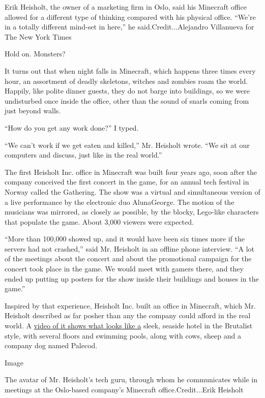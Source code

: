 Erik Heisholt, the owner of a marketing firm in Oslo, said his Minecraft
office allowed for a different type of thinking compared with his
physical office. ``We're in a totally different mind-set in here,'' he
said.Credit...Alejandro Villanueva for The New York Times

Hold on. Monsters?

It turns out that when night falls in Minecraft, which happens three
times every hour, an assortment of deadly skeletons, witches and zombies
roam the world. Happily, like polite dinner guests, they do not barge
into buildings, so we were undisturbed once inside the office, other
than the sound of snarls coming from just beyond walls.

``How do you get any work done?'' I typed.

``We can't work if we get eaten and killed,'' Mr. Heisholt wrote. ``We
sit at our computers and discuss, just like in the real world.''

The first Heisholt Inc. office in Minecraft was built four years ago,
soon after the company conceived the first concert in the game, for an
annual tech festival in Norway called the Gathering. The show was a
virtual and simultaneous version of a live performance by the electronic
duo AlunaGeorge. The motion of the musicians was mirrored, as closely as
possible, by the blocky, Lego-like characters that populate the game.
About 3,000 viewers were expected.

``More than 100,000 showed up, and it would have been six times more if
the servers had not crashed,'' said Mr. Heisholt in an offline phone
interview. ``A lot of the meetings about the concert and about the
promotional campaign for the concert took place in the game. We would
meet with gamers there, and they ended up putting up posters for the
show inside their buildings and houses in the game.''

Inspired by that experience, Heisholt Inc. built an office in Minecraft,
which Mr. Heisholt described as far posher than any the company could
afford in the real world. A
\href{https://www.youtube.com/watch?v=oV0DIWfOSCU\&feature=youtu.be}{video
of it shows what looks like a} sleek, seaside hotel in the Brutalist
style, with several floors and swimming pools, along with cows, sheep
and a company dog named Palecod.

Image

The avatar of Mr. Heisholt's tech guru, through whom he communicates
while in meetings at the Oslo-based company's Minecraft
office.Credit...Erik Heisholt

